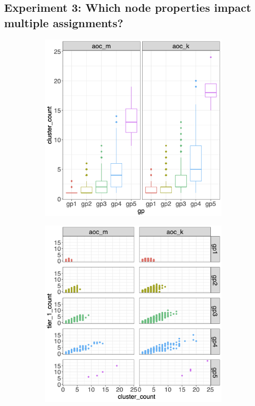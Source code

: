 \documentclass[12pt, oneside]{article}   	%
\begin{document}
\subsection{Experiment 3: Which node properties impact multiple assignments?}
\begin{figure}
\centering
\begin{subfigure}[t]{0.48\textwidth}
\centering
\includegraphics[width=\linewidth]{bl_group_cluster.png} 
\end{subfigure}
\hfill
\begin{subfigure}[t]{0.48\textwidth}
\centering
\includegraphics[width=\linewidth]{bl_cluster_tier.png} 

\end{subfigure}
\end{figure}
\end{document}
